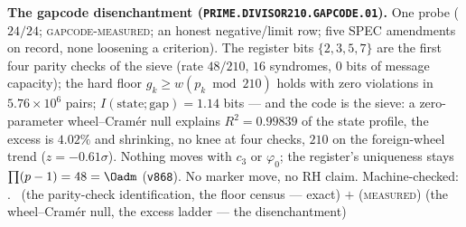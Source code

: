 \par\smallskip\noindent\textbf{The gapcode disenchantment
(\texttt{PRIME.DIVISOR210.\allowbreak GAPCODE.01}).}
One probe ($24/24$; \textsc{gapcode-measured}; an honest
negative/limit row; five SPEC amendments on record, none
loosening a criterion).  The register bits $\{2,3,5,7\}$ are the
first four parity checks of the sieve (rate $48/210$, $16$
syndromes, $0$ bits of message capacity); the hard floor $g_k
\ge w(p_k \bmod 210)$ holds with zero violations in
$5.76\times10^{6}$ pairs; $I(\text{state};\text{gap}) = 1.14$
bits --- and the code is the sieve: a zero-parameter
wheel--Cram\'er null explains $R^2 = 0.99839$ of the state
profile, the excess is $4.02\%$ and shrinking, no knee at four
checks, $210$ on the foreign-wheel trend ($z = -0.61\sigma$).
Nothing moves with $c_3$ or $\varphi_0$; the register's
uniqueness stays $\prod(p-1) = 48 = \Oadm$ (\texttt{v868}).  No
marker move, no RH claim.
Machine-checked: .
\mE\ (the parity-check identification, the floor census ---
exact) $+$ (\textsc{measured}) (the wheel--Cram\'er null, the
excess ladder --- the disenchantment)
\par\smallskip


